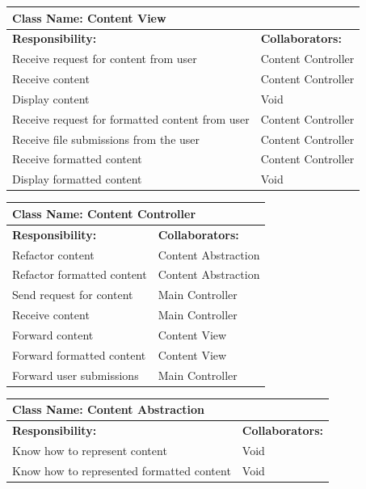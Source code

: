 \documentclass[]{article}
\begin{document}
	\begin{table}[H]
	\centering
		\begin{tabular}{|p{9cm}|p{3cm}|}
		\hline
		 \multicolumn{2}{|l|}{\textbf{Class Name: Content View}} \\
		\hline
		\textbf{Responsibility:} & \textbf{Collaborators:} \\
		\hline
		Receive request for content from user & Content Controller\\
		\hline
	    Receive content & Content Controller\\
	    \hline
	    Display content & Void\\
	    \hline 
	    Receive request for formatted content from user & Content Controller\\
	    \hline
	    Receive file submissions from the user & Content Controller\\
	    \hline
	    Receive formatted content & Content Controller\\
	    \hline
	    Display formatted content & Void\\
	    \hline
		\end{tabular}
	\end{table}
	
	\begin{table}[H]
	\centering
		\begin{tabular}{|p{9cm}|p{3cm}|}
		\hline
		 \multicolumn{2}{|l|}{\textbf{Class Name: Content Controller}} \\
		\hline
		\textbf{Responsibility:} & \textbf{Collaborators:} \\
		\hline
	    Refactor content & Content Abstraction\\
		\hline
		Refactor formatted content & Content Abstraction\\
		\hline
	    Send request for content & Main Controller\\
		\hline
		Receive content & Main Controller\\
		\hline
		Forward content & Content View\\
		\hline
		Forward formatted content & Content View\\
		\hline
		Forward user submissions & Main Controller\\
		\hline	
		\end{tabular}
	\end{table}
	
	\begin{table}[H]
	\centering
		\begin{tabular}{|p{9cm}|p{3cm}|}
		\hline
		 \multicolumn{2}{|l|}{\textbf{Class Name: Content Abstraction}} \\
		\hline
		\textbf{Responsibility:} & \textbf{Collaborators:} \\
		\hline
	    Know how to represent content  & Void\\
		\hline
		Know how to represented formatted content & Void\\
		\hline
		\end{tabular}
	\end{table}
	
\end{document}

